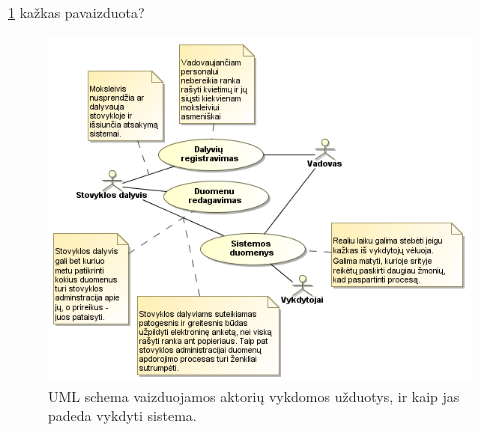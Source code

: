 \ref{fig:uml_tasks2} kažkas pavaizduota?

\begin{figure}[htb]
  \begin{center}
    \includegraphics[scale=0.8]{images/sistemos_tiekiama_nauda.png}
  \end{center}
  \caption{UML schema vaizduojamos aktorių vykdomos užduotys, ir kaip jas
    padeda vykdyti sistema.}
  \label{fig:uml_tasks2}
\end{figure}
